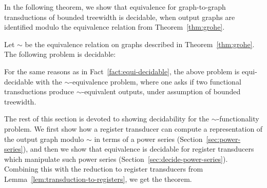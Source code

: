 In the following theorem, we show that equivalence for graph-to-graph \mso transductions of bounded treewidth is decidable, when output graphs are identified modulo the equivalence relation from Theorem~\ref{thm:grohe}. 
\begin{theorem}\label{thm:path-equivalence}
    Let $\sim$ be the equivalence relation on graphs described in Theorem~\ref{thm:grohe}. 
    The following problem is decidable:
\end{theorem}
 
For the same reasons as in Fact~\ref{fact:equi-decidable}, the above problem is equi-decidable with the $\sim$-equivalence problem, where one asks if two functional transductions produce $\sim$-equivalent outputs, under assumption of bounded treewidth. 

The rest of this section is devoted to showing decidability for the  $\sim$-functionality problem. We first show how a register transducer can compute a representation of the output graph modulo $\sim$ in terms of a power series (Section~\ref{sec:power-series}), and then we show that equivalence is decidable for register transducers which manipulate such power series (Section~\ref{sec:decide-power-series}). Combining this with the reduction to register transducers from Lemma~\ref{lem:transduction-to-registers}, we get the theorem.

